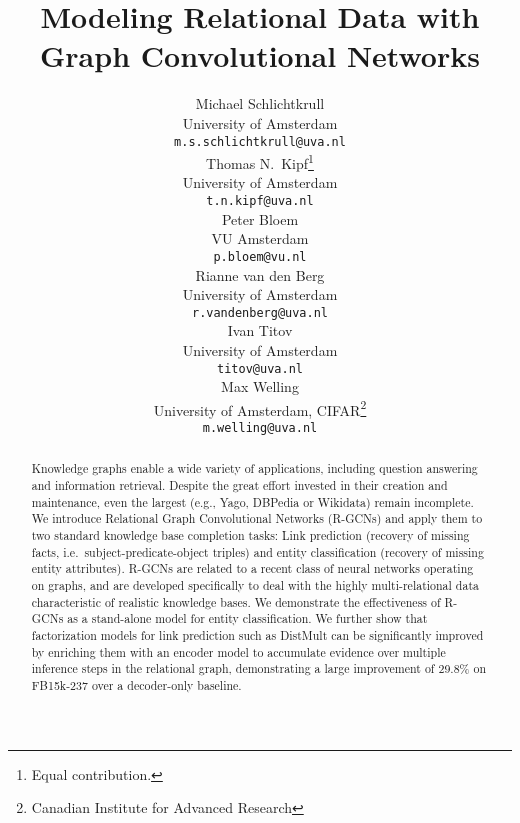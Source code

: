 \documentclass[letterpaper]{article} \usepackage{aaai18}  \usepackage{times}  \usepackage{helvet}  \usepackage{courier}  \usepackage{url}  \usepackage{graphicx}  \frenchspacing
\begin{document}
\title{Modeling Relational Data with Graph Convolutional Networks}

\author{
  Michael Schlichtkrull\\
  University of Amsterdam\\
  \texttt{m.s.schlichtkrull@uva.nl}\\\And
  Thomas N.~Kipf\thanks{Equal contribution.}\\
  University of Amsterdam\\
  \texttt{t.n.kipf@uva.nl}\\ \And
   Peter Bloem\\
  VU Amsterdam\\
  \texttt{p.bloem@vu.nl}\\ \AND
  Rianne van den Berg\\
  University of Amsterdam\\
  \texttt{r.vandenberg@uva.nl}\\\And
  Ivan Titov\\
  University of Amsterdam\\
  \texttt{titov@uva.nl}\\ \And
  Max Welling\\
  University of Amsterdam, CIFAR\thanks{Canadian Institute for Advanced Research}\\
  \texttt{m.welling@uva.nl}\\
}

\maketitle

\begin{abstract}

Knowledge graphs enable a wide variety of applications, including question answering and information retrieval. Despite the great effort invested in their creation and maintenance, even the largest (e.g., Yago, DBPedia or Wikidata) remain incomplete. We introduce Relational Graph Convolutional Networks (R-GCNs) and apply them to two standard knowledge base completion tasks: Link prediction (recovery of missing facts, i.e.~subject-predicate-object triples) and entity classification (recovery of missing entity attributes). R-GCNs are related to a recent class of neural networks operating on graphs, and are developed specifically to deal with the highly multi-relational data characteristic of realistic knowledge bases. We demonstrate the effectiveness of R-GCNs as a stand-alone model for entity classification. We further show that factorization models for link prediction such as DistMult can be significantly improved by enriching them with an encoder model to accumulate evidence over multiple inference steps in the relational graph, demonstrating a large improvement of 29.8\% on FB15k-237 over a decoder-only baseline.

\end{abstract}
\end{document}
